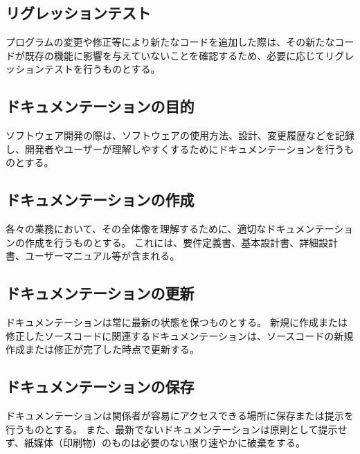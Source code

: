 \subsection{リグレッションテスト}
プログラムの変更や修正等により新たなコードを追加した際は、その新たなコードが既存の機能に影響を与えていないことを確認するため、必要に応じてリグレッションテストを行うものとする。


\clearpage

\subsection{ドキュメンテーションの目的}
ソフトウェア開発の際は、ソフトウェアの使用方法、設計、変更履歴などを記録し、開発者やユーザーが理解しやすくするためにドキュメンテーションを行うものとする。

\subsection{ドキュメンテーションの作成}
各々の業務において、その全体像を理解するために、適切なドキュメンテーションの作成を行うものとする。
これには、要件定義書、基本設計書、詳細設計書、ユーザーマニュアル等が含まれる。

\subsection{ドキュメンテーションの更新}
ドキュメンテーションは常に最新の状態を保つものとする。
新規に作成または修正したソースコードに関連するドキュメンテーションは、ソースコードの新規作成または修正が完了した時点で更新する。

\subsection{ドキュメンテーションの保存}
ドキュメンテーションは関係者が容易にアクセスできる場所に保存または提示を行うものとする。
また、最新でないドキュメンテーションは原則として提示せず、紙媒体（印刷物）のものは必要のない限り速やかに破棄をする。

